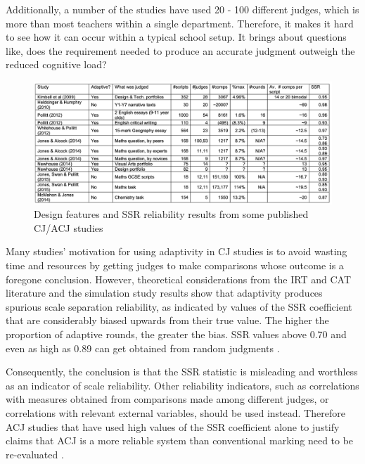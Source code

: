 		Additionally, a number of the studies have used 20 - 100 different judges, which is more than most teachers within a single department. Therefore, it makes it hard to see how it can occur within a typical school setup. It brings about questions like, does the requirement needed to produce an accurate judgment outweigh the reduced cognitive load? 
		
		
		\begin{figure}[h]
				\includegraphics[width=\textwidth]{graphics/cambridge_results.png}
				\caption{Design features and SSR reliability results from some published CJ/ACJ studies \cite{bramley2015investigating}}
				\label{fig:studies_comparison}
				\centering
			\end{figure}
		
		Many studies' motivation for using adaptivity in CJ studies is to avoid wasting time and resources by getting judges to make comparisons whose outcome is a foregone conclusion. However, theoretical considerations from the IRT and CAT literature and the simulation study results show that adaptivity produces spurious scale separation reliability, as indicated by values of the SSR coefficient that are considerably biased upwards from their true value. The higher the proportion of adaptive rounds, the greater the bias. SSR values above 0.70 and even as high as 0.89 can get obtained from random judgments \cite{bramley2015investigating}.  
		
		Consequently, the conclusion is that the SSR statistic is misleading and worthless as an indicator of scale reliability. Other reliability indicators, such as correlations with measures obtained from comparisons made among different judges, or correlations with relevant external variables, should be used instead. Therefore ACJ studies that have used high values of the SSR coefficient alone to justify claims that ACJ is a more reliable system than conventional marking need to be re-evaluated \cite{bramley2015investigating}.
		
